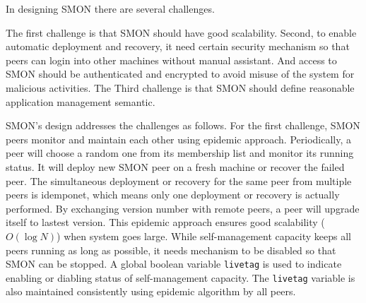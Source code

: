 


In designing SMON there are several challenges.

The first challenge is that SMON should have good
scalability. Second, to enable automatic deployment and
recovery, it need certain security mechanism so that peers
can login into other machines without manual assistant. And
access to SMON should be authenticated and encrypted to
avoid misuse of the system for malicious activities. The
Third challenge is that SMON should define reasonable
application management semantic.

SMON's design addresses the challenges as follows. For the
first challenge, SMON peers monitor and maintain each other
using epidemic approach. Periodically, a peer will choose a
random one from its membership list and monitor its running
status. It will deploy new SMON peer on a fresh machine or
recover the failed peer. The simultaneous deployment or
recovery for the same peer from multiple peers is idemponet,
which means only one deployment or recovery is actually
performed. By exchanging version number with remote peers, a
peer will upgrade itself to lastest version.  This epidemic
approach ensures good scalability ($O(\log N)$) when system
goes large. While self-management capacity keeps all peers
running as long as possible, it needs mechanism to be
disabled so that SMON can be stopped. A global boolean
variable \texttt{livetag} is used to indicate enabling or
diabling status of self-management capacity. The
\texttt{livetag} variable is also maintained consistently
using epidemic algorithm by all peers.

